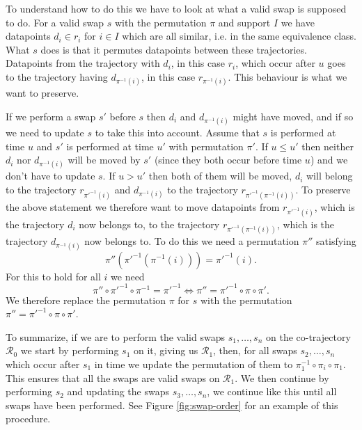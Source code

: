 \documentclass[12pt]{article}
\newcommand{\data}{d}
\newcommand{\traj}{r}
\newcommand{\cotraj}{\mathcal{R}}
\newcommand{\swap}{s}
\newcommand{\swaptime}{u}
\theoremstyle{definition}
\begin{document}
To understand how to do this we have to look at what a valid swap is
supposed to do. For a valid swap \(\swap\) with the permutation
\(\pi\) and support \(I\) we have datapoints
\(\data_{i} \in \traj_{i}\) for \(i \in I\) which are all similar,
i.e. in the same equivalence class. What \(\swap\) does is that it
permutes datapoints between these trajectories. Datapoints from
the trajectory with \(\data_{i}\), in this case \(\traj_{i}\), which
occur after \(\swaptime\) goes to the trajectory having
\(\data_{\pi^{-1}(i)}\), in this case \(\traj_{\pi^{-1}(i)}\). This
behaviour is what we want to preserve.

If we perform a swap \(\swap'\) before \(\swap\) then \(\data_{i}\)
and \(\data_{\pi^{-1}(i)}\) might have moved, and if so we need to
update \(\swap\) to take this into account. Assume that \(\swap\) is
performed at time \(\swaptime\) and \(\swap'\) is performed at time
\(\swaptime'\) with permutation \(\pi'\). If
\(\swaptime \leq \swaptime'\) then neither \(\data_{i}\) nor
\(\data_{\pi^{-1}(i)}\) will be moved by \(\swap'\) (since they both
occur before time \(\swaptime\)) and we don't have to update
\(\swap\). If \(\swaptime > \swaptime'\) then both of them will be
moved, \(\data_{i}\) will belong to the trajectory
\(\traj_{\pi'^{-1}(i)}\) and \(\data_{\pi^{-1}(i)}\) to the trajectory
\(\traj_{\pi'^{-1}(\pi^{-1}(i))}\). To preserve the above statement we
therefore want to move datapoints from \(\traj_{\pi'^{-1}(i)}\), which
is the trajectory \(\data_{i}\) now belongs to, to the trajectory
\(\traj_{\pi'^{-1}(\pi^{-1}(i))}\), which is the trajectory
\(\data_{\pi^{-1}(i)}\) now belongs to. To do this we need a
permutation \(\pi''\) satisfying
\begin{equation*}
  \pi''(\pi'^{-1}(\pi^{-1}(i))) = \pi'^{-1}(i).
\end{equation*}
For this to hold for all \(i\) we need
\begin{equation}
  \label{eq:swap-update}
  \pi'' \circ \pi'^{-1} \circ \pi^{-1} = \pi'^{-1}
  \iff \pi'' = \pi'^{-1} \circ \pi \circ \pi'.
\end{equation}
We therefore replace the permutation \(\pi\) for \(\swap\) with the
permutation \(\pi'' = \pi'^{-1} \circ \pi \circ \pi'\).

To summarize, if we are to perform the valid swaps
\(\swap_{1}, \dots, \swap_{n}\) on the co-trajectory \(\cotraj_{0}\)
we start by performing \(\swap_{1}\) on it, giving us \(\cotraj_{1}\),
then, for all swaps \(\swap_{2}, \dots, \swap_{n}\) which occur after
\(\swap_{1}\) in time we update the permutation of them to
\(\pi_{1}^{-1} \circ \pi_{i} \circ \pi_{1}\). This ensures that all
the swaps are valid swaps on \(\cotraj_{1}\). We then continue by
performing \(\swap_{2}\) and updating the swaps
\(\swap_{3}, \dots, \swap_{n}\), we continue like this until all swaps
have been performed. See Figure \ref{fig:swap-order} for an example of
this procedure.
\end{document}
